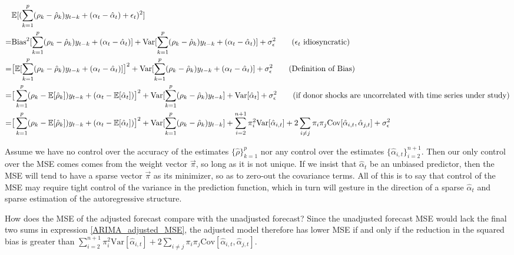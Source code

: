 \documentclass[11pt]{article}
\def\E{\mathbb{E}} %
\theoremstyle{definition}
\begin{document}
\begin{align}
  &\E[(\sum^{p}_{k=1}(\rho_{k}-\hat\rho_{k})y_{t-k} + (\alpha_{t} - \hat{\alpha}_{t}) + \epsilon_{t} )^{2}]\notag\\
  = &\text{Bias}^{2}[\sum^{p}_{k=1}(\rho_{k}-\hat\rho_{k})y_{t-k} + (\alpha_{t} - \hat{\alpha}_{t}) ] + \text{Var}[\sum^{p}_{k=1}(\rho_{k}-\hat\rho_{k})y_{t-k} + (\alpha_{t} - \hat{\alpha}_{t}) ] + \sigma^{2}_{\epsilon}\tag{$\epsilon_{t}$ idiosyncratic}\\
  = &\big[\E[\sum^{p}_{k=1}(\rho_{k}-\hat\rho_{k})y_{t-k} + (\alpha_{t} - \hat{\alpha}_{t}) ]\big]^{2} + \text{Var}[\sum^{p}_{k=1}(\rho_{k}-\hat\rho_{k})y_{t-k} + (\alpha_{t} - \hat{\alpha}_{t})]  + \sigma^{2}_{\epsilon}\tag{Definition of Bias}\\
  = &\big[\sum^{p}_{k=1}(\rho_{k}-\E[\hat\rho_{k}])y_{t-k} + (\alpha_{t} - \E[\hat{\alpha}_{t}]) \big]^{2} + \text{Var}[\sum^{p}_{k=1}(\rho_{k}-\hat\rho_{k})y_{t-k}] + \text{Var}[\hat{\alpha}_{t}]  + \sigma^{2}_{\epsilon}\tag{if donor shocks are uncorrelated with time series under study}\\
  = &\big[\sum^{p}_{k=1}(\rho_{k}-\E[\hat\rho_{k}])y_{t-k} + (\alpha_{t} - \E[\hat{\alpha}_{t}]) \big]^{2} + \text{Var}[\sum^{p}_{k=1}(\rho_{k}-\hat\rho_{k})y_{t-k}] + \sum_{i=2}^{n+1}\pi_{i}^{2}\text{Var}[\hat\alpha_{i,t}] + 2\sum_{i\neq j}\pi_{i}\pi_{j}\text{Cov}[\hat\alpha_{i,t},\hat\alpha_{j,t}]  + \sigma^{2}_{\epsilon}\label{ARIMA_adjusted_MSE}
\end{align}

Assume we have no control over the accuracy of the estimates $\{\hat\rho\}^{p}_{k=1}$ nor any control over the estimates $\{\hat\alpha_{i,t}\}_{i=2}^{n+1}$.  Then our only control over the MSE comes comes from the weight vector $\vec{\pi}$, so long as it is not unique.  If we insist that $\hat\alpha_{t}$ be an unbiased predictor, then the MSE will tend to have a sparse vector $\vec{\pi}$ as its minimizer, so as to zero-out the covariance terms.  All of this is to say that control of the MSE may require tight control of the variance in the prediction function, which in turn will gesture in the direction of a sparse $\hat\alpha_{t}$ and sparse estimation of the autoregressive structure.

How does the MSE of the adjusted forecast compare with the unadjusted forecast?  Since the unadjusted forecast MSE would lack the final two sums in expression \ref{ARIMA_adjusted_MSE}, the adjusted model therefore has lower MSE if and only if the reduction in the squared bias is greater than $\sum_{i=2}^{n+1}\pi_{i}^{2}\text{Var}[\hat\alpha_{i,t}] + 2\sum_{i\neq j}\pi_{i}\pi_{j}\text{Cov}[\hat\alpha_{i,t},\hat\alpha_{j,t}]$.
\end{document}
